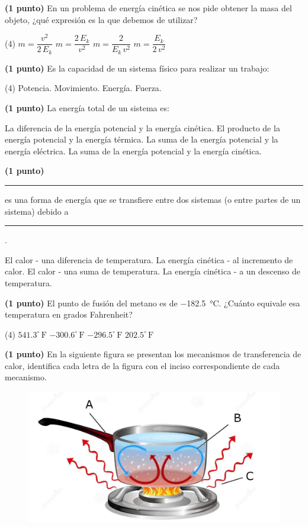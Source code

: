 \documentclass[12pt, letter]{exam}
\newcommand{\Fahrenheit}[1]{${#1}^{\circ} \, \text{F}$}
\begin{document}
\begin{questions}
    \question\textbf{(1 punto)} En un problema de energía cinética se nos pide obtener la masa del objeto, ¿qué expresión es la que debemos de utilizar?
    \begin{tasks}(4)
        \task $m = \dfrac{v^{2}}{2 \, E_{k}}$
        \task $m = \dfrac{2 \, E_{k}}{v^{2}}$
        \task $m = \dfrac{2}{E_{k} \, v^{2}}$
        \task $m = \dfrac{E_{k}}{2 \, v^{2}}$
    \end{tasks}
    \question\textbf{(1 punto)} Es la capacidad de un sistema físico para realizar un trabajo:
    \begin{tasks}(4)
        \task Potencia.
        \task Movimiento.
        \task Energía.
        \task Fuerza.
    \end{tasks}
    \question\textbf{(1 punto)} La energía total de un sistema es:
    \begin{tasks}
        \task La diferencia de la energía potencial y la energía cinética.
        \task El producto de la energía potencial y la energía térmica.
        \task La suma de la energía potencial y la energía eléctrica.
        \task La suma de la energía potencial y la energía cinética.
    \end{tasks}
    \question\textbf{(1 punto)} \rule{2cm}{0.1mm} es una forma de energía que se transfiere entre dos sistemas (o entre partes de un sistema) debido a \rule{2cm}{0.1mm}.
    \begin{tasks}
        \task El calor - una diferencia de temperatura.
        \task La energía cinética - al incremento de calor.
        \task El calor - una suma de temperatura.
        \task La energía cinética - a un descenso de temperatura.
    \end{tasks}
    \question\textbf{(1 punto)} El punto de fusión del metano es de \SI{-182.5}{\degreeCelsius}. ¿Cuánto equivale esa temperatura en grados Fahrenheit?
    \begin{tasks}(4)
        \task \Fahrenheit{541.3}
        \task \Fahrenheit{-300.6}
        \task \Fahrenheit{-296.5}
        \task \Fahrenheit{202.5}
    \end{tasks}
    \question\textbf{(1 punto)} En la siguiente figura se presentan los mecanismos de transferencia de calor, identifica cada letra de la figura con el inciso correspondiente de cada mecanismo.
    \begin{figure}[H]
        \centering
        \includegraphics[scale=0.2]{Transferencia_Calor_01.jpg}

\end{figure}
\end{questions}
\end{document}
